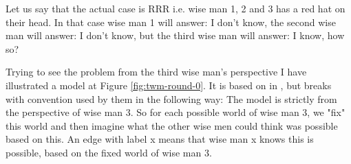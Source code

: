 Let us say that the actual case is RRR i.e. wise man 1, 2 and 3 has a red hat on their head.
In that case wise man 1 will answer: I don't know, the second wise man will answer: I don't know, but the third wise man will answer: I know, how so?

Trying to see the problem from the third wise man's perspective I have illustrated a model at Figure \ref{fig:twm-round-0}. It is based on \KTfourfiveN in \cite{HuthAndRyan2004KT45n}, but breaks with convention used by them in the following way:
The model is strictly from the perspective of wise man 3. So for each possible world of wise man 3, we "fix" this world and then imagine what the other wise men could think was possible based on this. An edge with label x means that wise man x knows this is possible, based on the fixed world of wise man 3.

